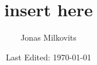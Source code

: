 


\begin{titlepage}
  \title{insert here} %
  \author{Jonas Milkovits}
  \date{Last Edited: \today}
\end{titlepage}



\maketitle
{} %
\tableofcontents
\clearpage
{} %


\clearpage


\clearpage


\clearpage


\clearpage


